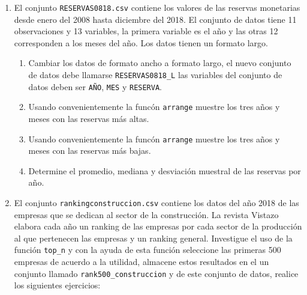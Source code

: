 \documentclass[letterpaper,]{book}
\providecommand{\tightlist}{%
  \setlength{\itemsep}{0pt}\setlength{\parskip}{0pt}}
\begin{document}
\begin{enumerate}
\def\labelenumi{\arabic{enumi}.}
\item
  El conjunto \texttt{RESERVAS0818.csv} contiene los valores de las reservas monetarias desde enero del 2008 hasta diciembre del 2018. El conjunto de datos tiene 11 observaciones y 13 variables, la primera variable es el año y las otras 12 corresponden a los meses del año. Los datos tienen un formato largo.

  \begin{enumerate}
  \def\labelenumii{\alph{enumii}.}
  \tightlist
  \item
    Cambiar los datos de formato ancho a formato largo, el nuevo conjunto de datos debe llamarse \texttt{RESERVAS0818\_L} las variables del conjunto de datos deben ser \texttt{AÑO}, \texttt{MES} y \texttt{RESERVA}.
  \item
    Usando convenientemente la funcón \texttt{arrange} muestre los tres años y meses con las reservas más altas.
  \item
    Usando convenientemente la funcón \texttt{arrange} muestre los tres años y meses con las reservas más bajas.
  \item
    Determine el promedio, mediana y desviación muestral de las reservas por año.
  \end{enumerate}
\item
  El conjunto \texttt{rankingconstruccion.csv} contiene los datos del año 2018 de las empresas que se dedican al sector de la construcción. La revista Vistazo elabora cada año un ranking de las empresas por cada sector de la producción al que pertenecen las empresas y un ranking general. Investigue el uso de la función \texttt{top\_n} y con la ayuda de esta función seleccione las primeras 500 empresas de acuerdo a la utilidad, almacene estos resultados en el un conjunto llamado \texttt{rank500\_construccion} y de este conjunto de datos, realice los siguientes ejercicios:


\end{enumerate}
\end{document}

